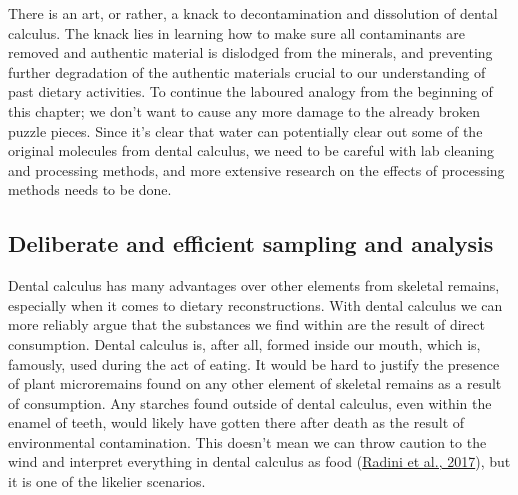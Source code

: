 \documentclass[
  letterpaper,
]{book}
\begin{document}
There is an art, or rather, a knack to decontamination and dissolution
of dental calculus. The knack lies in learning how to make sure all
contaminants are removed and authentic material is dislodged from the
minerals, and preventing further degradation of the authentic materials
crucial to our understanding of past dietary activities. To continue the
laboured analogy from the beginning of this chapter; we don't want to
cause any more damage to the already broken puzzle pieces. Since it's
clear that water can potentially clear out some of the original
molecules from dental calculus, we need to be careful with lab cleaning
and processing methods, and more extensive research on the effects of
processing methods needs to be done.

\hypertarget{deliberate-and-efficient-sampling-and-analysis}{%
\subsection{Deliberate and efficient sampling and
analysis}\label{deliberate-and-efficient-sampling-and-analysis}}

Dental calculus has many advantages over other elements from skeletal
remains, especially when it comes to dietary reconstructions. With
dental calculus we can more reliably argue that the substances we find
within are the result of direct consumption. Dental calculus is, after
all, formed inside our mouth, which is, famously, used during the act of
eating. It would be hard to justify the presence of plant microremains
found on any other element of skeletal remains as a result of
consumption. Any starches found outside of dental calculus, even within
the enamel of teeth, would likely have gotten there after death as the
result of environmental contamination. This doesn't mean we can throw
caution to the wind and interpret everything in dental calculus as food
(\protect\hyperlink{ref-radiniFoodPathways2017}{Radini et al., 2017}),
but it is one of the likelier scenarios.
\end{document}
